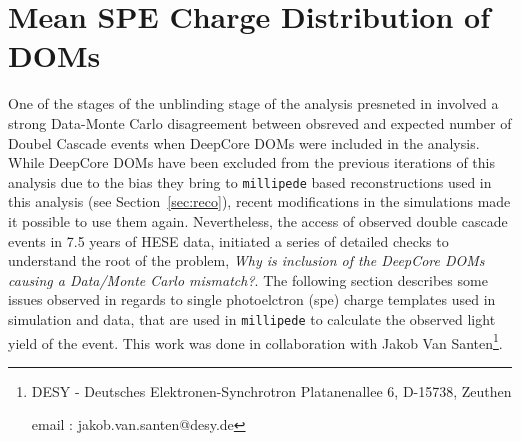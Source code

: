 \chapter{Mean SPE Charge Distribution of DOMs}
\label{ch:spe_check}
One of the stages of the unblinding stage of the analysis presneted in  involved a strong Data-Monte Carlo disagreement between obsreved and expected number of Doubel Cascade events when DeepCore DOMs were included in the analysis. While DeepCore DOMs have been excluded from the previous iterations of this analysis  due to the bias they bring to \texttt{millipede} based reconstructions used in this analysis (see Section~\ref{sec:reco}), recent modifications in the simulations made it possible to use them again. Nevertheless, the access of observed double cascade events in 7.5 years of HESE data, initiated a series of detailed checks to understand the root of the problem, \emph{Why is inclusion of the  DeepCore DOMs causing a Data/Monte Carlo mismatch?}. The following section describes some issues observed in regards to single photoelctron (spe) charge templates used in simulation and data, that are used in \texttt{millipede} to calculate the observed light yield of the event. This work was done in collaboration with Jakob Van Santen\footnote{DESY - Deutsches Elektronen-Synchrotron
Platanenallee 6, D-15738, Zeuthen

email : jakob.van.santen@desy.de}.

